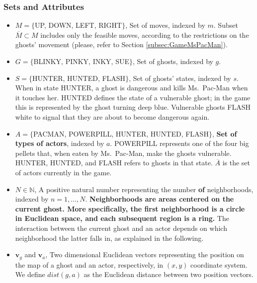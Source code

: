 \documentclass[journal]{IEEEtran}
\begin{document}
\subsubsection{Sets and Attributes}
\begin{itemize}
  \item $M=\{$UP, DOWN, LEFT, RIGHT$\}$, Set of moves, indexed by $m$. Subset $\overline{M}\subset M$ includes only the feasible moves, according to the restrictions on the ghosts' movement (please, refer to Section \ref{subsec:GameMsPacMan}).
  \item $G=\{$BLINKY, PINKY, INKY, SUE$\}$, Set of ghosts, indexed by $g$.
  \item $S=\{$HUNTER, HUNTED, FLASH$\}$, Set of ghosts' states, indexed by $s$. When in state HUNTER, a ghost is dangerous and kills Ms.\  Pac-Man when it touches her. HUNTED defines the state of a vulnerable ghost; in the game this is represented by the ghost turning deep blue. Vulnerable ghosts FLASH white to signal that they are about to become dangerous again.
  \item $A=\{$PACMAN, POWERPILL, HUNTER, HUNTED, FLASH$\}$, \textbf{Set of types of actors}, indexed by $a$. POWERPILL represents one of the four big pellets that, when eaten by Ms.\  Pac-Man, make the ghosts vulnerable. HUNTER, HUNTED, and FLASH refers to ghosts in that state. $\overline{A}$ is the set of actors currently in the game.
  \item $N \in \mathbb{N}$, A positive natural number representing the number \textbf{of} neighborhoods, indexed by $n = 1, \ldots, N$. \textbf{Neighborhoods are areas centered on the current ghost. More specifically, the first neighborhood is a circle in Euclidean space, and each subsequent region is a ring.} The interaction between the current ghost and an actor depends on which neighborhood the latter falls in, as explained in the following.
  \item $\mathbf{v}_g$ and $\mathbf{v}_a$, Two dimensional Euclidean vectors representing the position on the map of a ghost and an actor, respectively, in $(x,y)$ coordinate system. We define $dist(g,a)$ as the Euclidean distance between two position vectors.
\end{itemize}
\end{document}
